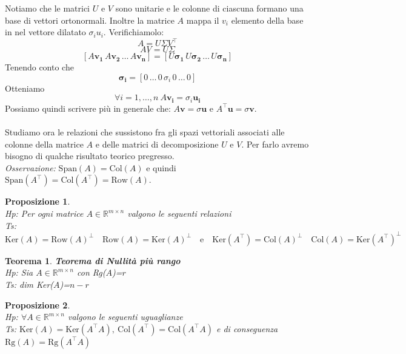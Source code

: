 \documentclass[11pt]{article}
\newtheorem{proposition}{Proposizione}
\newtheorem{theorem}{Teorema}
\newcommand{\R}{\mathbb{R}} %
\begin{document}
\newpage
\noindent
Notiamo che le matrici $U$ e $V$ sono unitarie e le colonne di ciascuna formano una base di vettori ortonormali. Inoltre la matrice $A$ mappa il $v_i$ elemento della base in nel vettore dilatato $\sigma_iu_i$.
\noindent
Verifichiamolo:
\[
A = U\Sigma V^\top       
\]
\[
AV = U\Sigma
\]
\[ 
[A\mathbf{v_1} \, A\mathbf{v_2} \, \dots \, A\mathbf{v_n}] = [U\mathbf{\sigma_1} \, U\mathbf{\sigma_2} \, \dots \, U\mathbf{\sigma_n}]
\]
Tenendo conto che 
\[
\mathbf{\sigma_i}=[0 \, \dots \, 0 \, \sigma_i \, 0 \, \dots \, 0]
\]
Otteniamo
$$\forall i=1,\dots,n\ A\mathbf{v_i}=\sigma_i\mathbf{u_i}
$$
Possiamo quindi scrivere più in generale che:  $A\mathbf{v}=\sigma\mathbf{u}$ e $A^\top      \mathbf{u}=\sigma\mathbf{v}$.\\
\\
Studiamo ora le relazioni che sussistono fra gli spazi vettoriali associati alle colonne della matrice $A$ e delle matrici di decomposizione $U$ e $V$. Per farlo avremo bisogno di qualche risultato teorico pregresso.\\
\textit{Osservazione:} $\text{Span}(A)=\text{Col}(A)$ e quindi $\text{Span}(A^\top      )=\text{Col}(A^\top      )=\text{Row}(A)$.
\begin{proposition}
\textbf{}\\
\textit{Hp:} Per ogni matrice $A \in \R^{m \times n}$ valgono le seguenti relazioni\\
\textit{Ts:} $ \text{Ker}(A)=\text{Row}(A)^\perp \quad \text{Row}(A)=\text{Ker}(A)^\perp \quad \text{e} \quad \text{Ker}(A^\top)=\text{Col}(A)^\perp \quad \text{Col}(A)=\text{Ker}(A^\top)^\perp $ 
\end{proposition}
\begin{theorem}\label{null}
\textbf{Teorema di Nullità più rango}\\
\textit{Hp:} Sia $A\in \R^{m \times n}$ con Rg($A$)=$r$\\
\textit{Ts:} dim Ker($A$)=$n-r$
\end{theorem}
\noindent
\begin{proposition}\label{prop gal}
\textbf{}\\
\textit{Hp:} $\forall A \in \R^{m \times n}$ valgono le seguenti uguaglianze\\
\textit{Ts:} $\text{Ker}(A)=\text{Ker}(A^\top      A),\ \text{Col}(A^\top      )=\text{Col}(A^\top      A)$ e di conseguenza $\text{Rg}(A)=\text{Rg}(A^\top      A)$
\end{proposition}
\end{document}

